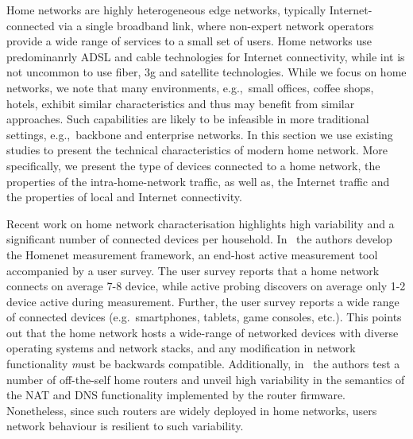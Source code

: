 Home networks are highly heterogeneous edge networks, typically
Internet-connected via a single broadband link, where non-expert network
operators provide a wide range of services to a small set of users.  Home
networks use predominanrly ADSL and cable technologies for Internet connectivity, while
int is not uncommon to use fiber, 3g and satellite technologies.
While we focus on home networks, we note that many environments, e.g.,~small
offices, coffee shops, hotels, exhibit similar characteristics and thus may
benefit from similar approaches. Such capabilities are likely to be infeasible
in more traditional settings, e.g.,~backbone and enterprise networks. In this
section we use existing studies to present the technical characteristics of
modern home network. More specifically, we present the type of devices connected to a
home network, the properties of the intra-home-network traffic, as well as, the
Internet traffic and the properties of local and Internet connectivity. 

Recent work on home network characterisation highlights high variability and 
a significant number of connected devices per household. 
In~\cite{homenetProfiler} the authors develop the Homenet measurement framework,
an end-host active measurement tool accompanied by a user survey. The user
survey reports that a home network connects on average 7-8 device, while active
probing discovers on average only 1-2 device active during measurement. Further,
the user survey reports a wide range of connected devices (e.g.~smartphones,
tablets, game consoles, etc.). This points out that the home network hosts a
wide-range of networked devices with diverse operating systems and network
stacks, and any modification in network functionality {\emph must} be backwards
compatible. Additionally, in~\cite{Hatonen10} the authors test a number of
off-the-self home routers and unveil high variability in the semantics of the
NAT and DNS functionality implemented by the router firmware. Nonetheless, since
such routers are widely deployed in home networks, users network behaviour is
resilient to such variability.

